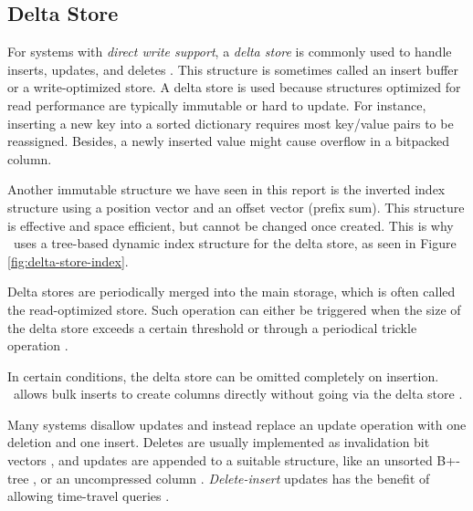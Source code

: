 \subsection{Delta Store}
\label{sub:Delta Store}

For systems with \textit{direct write support}, a \textit{delta store} is commonly used to handle inserts, updates, and deletes \cite{Raman2013-em, Stonebraker2005-qz}. This structure is sometimes called an insert buffer or a write-optimized store. A delta store is used because structures optimized for read performance are typically immutable or hard to update. For instance, inserting a new key into a sorted dictionary requires most key/value pairs to be reassigned. Besides, a newly inserted value might cause overflow in a bitpacked column.


Another immutable structure we have seen in this report is the inverted index structure using a position vector and an offset vector (prefix sum). This structure is effective and space efficient, but cannot be changed once created. This is why \hyrise~uses a tree-based dynamic index structure for the delta store, as seen in Figure \ref{fig:delta-store-index}.


Delta stores are periodically merged into the main storage, which is often called the read-optimized store. Such operation can either be triggered when the size of the delta store exceeds a certain threshold or through a periodical trickle operation \cite{Lahiri2015-mz, Farber2012-vh}.

In certain conditions, the delta store can be omitted completely on insertion. \mssql~allows bulk inserts to create columns directly without going via the delta store \cite{Larson2013-mc}.

Many systems disallow updates and instead replace an update operation with one deletion and one insert. Deletes are usually implemented as invalidation bit vectors \cite{Raman2013-em, Lamb2012-kg}, and updates are appended to a suitable structure, like an unsorted B+-tree \cite{Psaroudakis2014-ma}, or an uncompressed column \cite{Farber2012-vh}. \textit{Delete-insert} updates has the benefit of allowing time-travel queries \cite{Schwalb2014-hn, Plattner2014-fr}.

